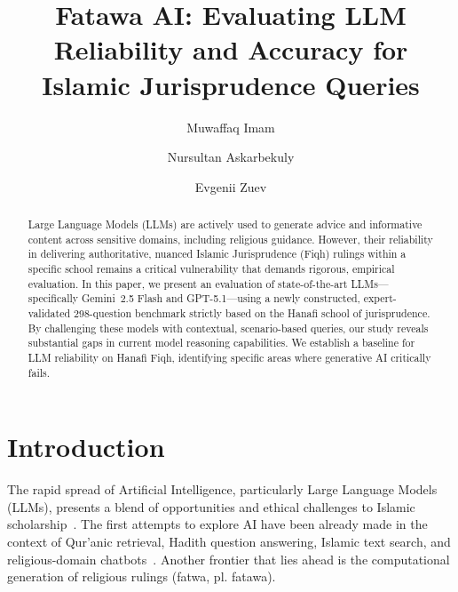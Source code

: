\documentclass[runningheads]{llncs}
\begin{document}
\title{Fatawa AI: Evaluating LLM Reliability and Accuracy for Islamic Jurisprudence Queries}

\author{Muwaffaq Imam \and
Nursultan Askarbekuly \and
Evgenii Zuev}


\maketitle

\begin{abstract}
Large Language Models (LLMs) are actively used to generate advice and informative content across sensitive domains, including religious guidance. However, their reliability in delivering authoritative, nuanced Islamic Jurisprudence (Fiqh) rulings within a specific school remains a critical vulnerability that demands rigorous, empirical evaluation. In this paper, we present an evaluation of state-of-the-art LLMs---specifically Gemini~2.5 Flash and GPT-5.1---using a newly constructed, expert-validated 298-question benchmark strictly based on the Hanafi school of jurisprudence. By challenging these models with contextual, scenario-based queries, our study reveals substantial gaps in current model reasoning capabilities. We establish a baseline for LLM reliability on Hanafi Fiqh, identifying specific areas where generative AI critically fails.

\end{abstract}

\section{Introduction}

The rapid spread of Artificial Intelligence, particularly Large Language Models (LLMs), presents a blend of opportunities and ethical challenges to Islamic scholarship~\cite{patel2023building,atif2025fiqhqa,islamicEval2025}. The first attempts to explore AI have been already made in the context of Qur'anic retrieval, Hadith question answering, Islamic text search, and religious-domain chatbots~\cite{malhas2020ayatec,malhas2023quranqa,wiharja2022questions,rizqullah2023qasina,mohammed2022english}. Another frontier that lies ahead is the computational generation of religious rulings (fatwa, pl. fatawa).
\end{document}
